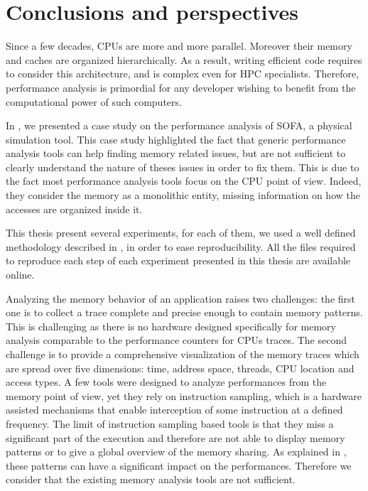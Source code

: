 \chapter{Conclusions and perspectives}
\label{chap:cncl}

Since a few decades, \glspl{CPU} are more and more parallel.
Moreover their memory and caches are organized hierarchically.
As a result, writing efficient code requires to consider this architecture, and is complex even for \gls{HPC} specialists.
Therefore, performance analysis is primordial for any developer wishing to benefit from the computational power of such computers.


In , we presented a case study on the performance analysis of \gls{SOFA}, a physical simulation tool.
This case study highlighted the fact that generic performance analysis tools can help finding memory related issues, but are not sufficient to clearly understand the nature of theses issues in order to fix them.
This is due to the fact most performance analysis tools focus on the \gls{CPU} point of view.
Indeed, they consider the memory as a monolithic entity, missing information on how the accesses are organized inside it.

This thesis present several experiments, for each of them, we used a well defined methodology described in , in order to ease reproducibility.
All the files required to reproduce each step of each experiment presented in this thesis are available online.

Analyzing the memory behavior of an application raises two challenges: the first one is to collect a trace complete and precise enough to contain memory patterns.
This is challenging as there is no hardware designed specifically for memory analysis comparable to the performance counters for \glspl{CPU} traces.
The second challenge is to provide a comprehensive visualization of the memory traces which are spread over five dimensions: time, address space, threads, \gls{CPU} location and access types.
A few tools were designed to analyze performances from the memory point of view, yet they rely on instruction sampling, which is a hardware assisted mechanisms that enable interception of some instruction at a defined frequency.
The limit of instruction sampling based tools is that they miss a significant part of the execution and therefore are not able to display memory patterns or to give a global overview of the memory sharing.
As explained in , these patterns can have a significant impact on the performances.
Therefore we consider that the existing memory analysis tools are not sufficient.

